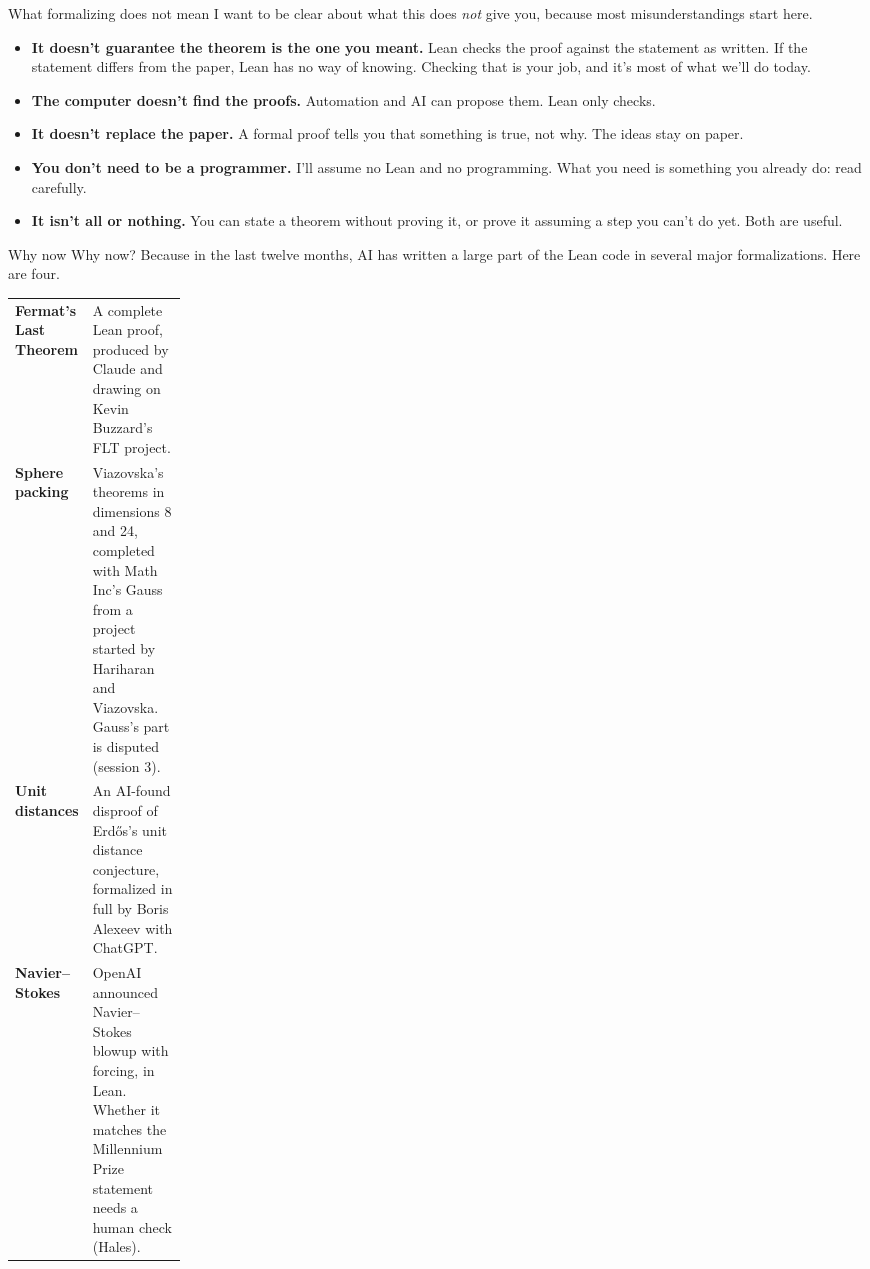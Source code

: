 \documentclass[10pt, aspectratio=169]{beamer}
\begin{document}
\begin{frame}[fragile]{What formalizing does not mean}
I want to be clear about what this does \emph{not} give you, because most misunderstandings start here.

\vspace{0.3em}
\begin{itemize}
\item \textbf{It doesn't guarantee the theorem is the one you meant.} Lean checks the proof against the statement as written. If the statement differs from the paper, Lean has no way of knowing. Checking that is your job, and it's most of what we'll do today.
\item \textbf{The computer doesn't find the proofs.} Automation and AI can propose them. Lean only checks.
\item \textbf{It doesn't replace the paper.} A formal proof tells you that something is true, not why. The ideas stay on paper.
\item \textbf{You don't need to be a programmer.} I'll assume no Lean and no programming. What you need is something you already do: read carefully.
\item \textbf{It isn't all or nothing.} You can state a theorem without proving it, or prove it assuming a step you can't do yet. Both are useful.
\end{itemize}
\end{frame}

\begin{frame}[fragile]{Why now}
Why now? Because in the last twelve months, AI has written a large part of the Lean code in several major formalizations. Here are four.

\vspace{0.3em}
\small
\renewcommand{\arraystretch}{1.25}
\begin{tabularx}{\linewidth}{@{}>{\raggedright\arraybackslash\bfseries}p{0.2\linewidth}X@{}}
\toprule
Fermat's Last Theorem & A complete Lean proof, produced by Claude and drawing on Kevin Buzzard's FLT project.\\
Sphere packing & Viazovska's theorems in dimensions 8 and 24, completed with Math Inc's Gauss from a project started by Hariharan and Viazovska. Gauss's part is disputed (session 3).\\
Unit distances & An AI-found disproof of Erdős's unit distance conjecture, formalized in full by Boris Alexeev with ChatGPT.\\
Navier--Stokes & OpenAI announced Navier--Stokes blowup with forcing, in Lean. Whether it matches the Millennium Prize statement needs a human check (Hales).\\
\bottomrule
\end{tabularx}

\end{frame}
\end{document}
